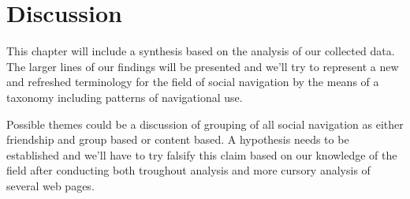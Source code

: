 \chapter{Discussion}
\label{chapter:discussion}

This chapter will include a synthesis based on the analysis of our collected
data. The larger lines of our findings will be presented and we'll try to
represent a new and refreshed terminology for the field of social navigation
by the means of a taxonomy including patterns of navigational use.

Possible themes could be a discussion of grouping of all social navigation as
either friendship and group based or content based. A hypothesis needs to be
established and we'll have to try falsify this claim based on our knowledge of
the field after conducting both troughout analysis and more cursory analysis
of several web pages.
